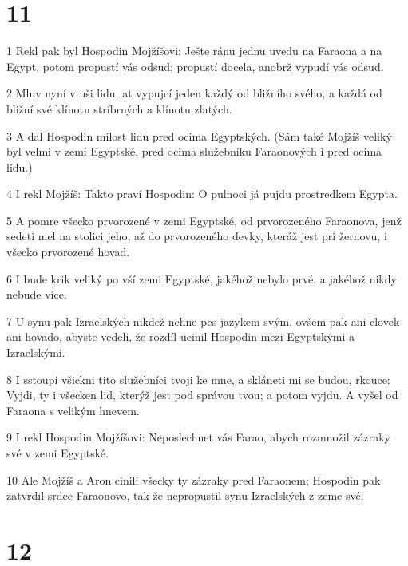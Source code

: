 \chapter{11}

\par 1 Rekl pak byl Hospodin Mojžíšovi: Ješte ránu jednu uvedu na Faraona a na Egypt, potom propustí vás odsud; propustí docela, anobrž vypudí vás odsud.
\par 2 Mluv nyní v uši lidu, at vypujcí jeden každý od bližního svého, a každá od bližní své klínotu stríbrných a klínotu zlatých.
\par 3 A dal Hospodin milost lidu pred ocima Egyptských. (Sám také Mojžíš veliký byl velmi v zemi Egyptské, pred ocima služebníku Faraonových i pred ocima lidu.)
\par 4 I rekl Mojžíš: Takto praví Hospodin: O pulnoci já pujdu prostredkem Egypta.
\par 5 A pomre všecko prvorozené v zemi Egyptské, od prvorozeného Faraonova, jenž sedeti mel na stolici jeho, až do prvorozeného devky, kteráž jest pri žernovu, i všecko prvorozené hovad.
\par 6 I bude krik veliký po vší zemi Egyptské, jakéhož nebylo prvé, a jakéhož nikdy nebude více.
\par 7 U synu pak Izraelských nikdež nehne pes jazykem svým, ovšem pak ani clovek ani hovado, abyste vedeli, že rozdíl ucinil Hospodin mezi Egyptskými a Izraelskými.
\par 8 I sstoupí všickni tito služebníci tvoji ke mne, a skláneti mi se budou, rkouce: Vyjdi, ty i všecken lid, kterýž jest pod správou tvou; a potom vyjdu. A vyšel od Faraona s velikým hnevem.
\par 9 I rekl Hospodin Mojžíšovi: Neposlechnet vás Farao, abych rozmnožil zázraky své v zemi Egyptské.
\par 10 Ale Mojžíš a Aron cinili všecky ty zázraky pred Faraonem; Hospodin pak zatvrdil srdce Faraonovo, tak že nepropustil synu Izraelských z zeme své.

\chapter{12}


